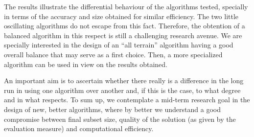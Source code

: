 \documentclass{article}
\begin{document}
The results illustrate the differential behaviour of the algorithms
tested, specially in terms of the accuracy and size obtained for
similar efficiency. The two little oscillating algorithms do not
escape from this fact. Therefore, the obtention of a balanced
algorithm in this respect is still a challenging research avenue. We
are specially interested in the design of an ``all terrain'' algorithm
having a good overall balance that may serve as a first choice. Then,
a more specialized algorithm can be used in view on the results
obtained.



An important aim is to ascertain whether there really is a difference
in the long run in using one algorithm over another and, if this is
the case, to what degree and in what respects. To sum up, we
contemplate a mid-term research goal in the design of new, better
algorithms, where by better we understand a good compromise between
final subset size, quality of the solution (as given by the evaluation
measure) and computational efficiency.
\end{document}
